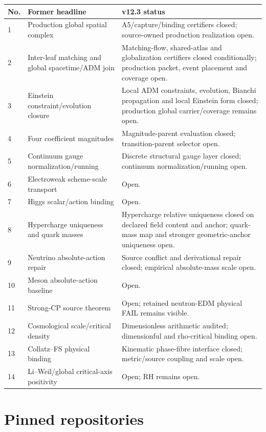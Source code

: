 \begin{longtable}{p{}p{}p{}}
\toprule
No. & Former headline & v12.3 status \\
\midrule
1 & Production global spatial complex &
A5/capture/binding certifiers closed; source-owned production realization open. \\
2 & Inter-leaf matching and global spacetime/ADM join &
Matching-flow, shared-atlas and globalization certifiers closed conditionally;
production packet, event placement and coverage open. \\
3 & Einstein constraint/evolution closure &
Local ADM constraints, evolution, Bianchi propagation and local Einstein form
closed; production global carrier/coverage remains open. \\
4 & Four coefficient magnitudes &
Magnitude-parent evaluation closed; transition-parent selector open. \\
5 & Continuum gauge normalization/running &
Discrete structural gauge layer closed; continuum normalization/running open. \\
6 & Electroweak scheme-scale transport &
Open. \\
7 & Higgs scalar/action binding &
Open. \\
8 & Hypercharge uniqueness and quark masses &
Hypercharge relative uniqueness closed on declared field content and anchor;
quark-mass map and stronger geometric-anchor uniqueness open. \\
9 & Neutrino absolute-action repair &
Source conflict and derivational repair closed; empirical absolute-mass scale
open. \\
10 & Meson absolute-action baseline &
Open. \\
11 & Strong-CP source theorem &
Open; retained neutron-EDM physical FAIL remains visible. \\
12 & Cosmological scale/critical density &
Dimensionless arithmetic audited; dimensionful and rho-critical binding open. \\
13 & Collatz--FS physical binding &
Kinematic phase-fibre interface closed; metric/source coupling and scale open. \\
14 & Li--Weil/global critical-axis positivity &
Open; RH remains open. \\
\bottomrule
\end{longtable}

\section{Pinned repositories}

